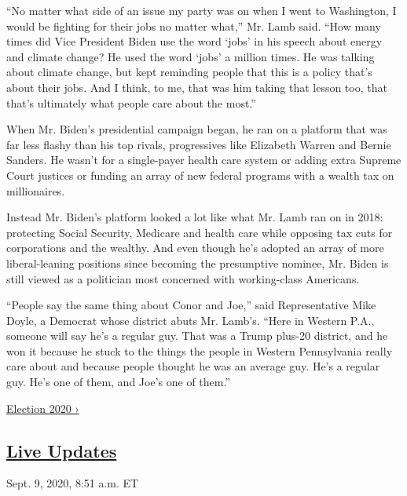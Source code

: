 ``No matter what side of an issue my party was on when I went to
Washington, I would be fighting for their jobs no matter what,'' Mr.
Lamb said. ``How many times did Vice President Biden use the word `jobs'
in his speech about energy and climate change? He used the word `jobs' a
million times. He was talking about climate change, but kept reminding
people that this is a policy that's about their jobs. And I think, to
me, that was him taking that lesson too, that that's ultimately what
people care about the most.''

When Mr. Biden's presidential campaign began, he ran on a platform that
was far less flashy than his top rivals, progressives like Elizabeth
Warren and Bernie Sanders. He wasn't for a single-payer health care
system or adding extra Supreme Court justices or funding an array of new
federal programs with a wealth tax on millionaires.

Instead Mr. Biden's platform looked a lot like what Mr. Lamb ran on in
2018: protecting Social Security, Medicare and health care while
opposing tax cuts for corporations and the wealthy. And even though he's
adopted an array of more liberal-leaning positions since becoming the
presumptive nominee, Mr. Biden is still viewed as a politician most
concerned with working-class Americans.

``People say the same thing about Conor and Joe,'' said Representative
Mike Doyle, a Democrat whose district abuts Mr. Lamb's. ``Here in
Western P.A., someone will say he's a regular guy. That was a Trump
plus-20 district, and he won it because he stuck to the things the
people in Western Pennsylvania really care about and because people
thought he was an average guy. He's a regular guy. He's one of them, and
Joe's one of them.''

\href{https://www.nytimes3xbfgragh.onion/news-event/2020-election}{Election
2020 ›}

\hypertarget{live-updates}{%
\subsection{\texorpdfstring{\href{https://www.nytimes3xbfgragh.onion/live/2020/09/09/us/trump-vs-biden}{Live
Updates}}{Live Updates}}\label{live-updates}}

\href{https://www.nytimes3xbfgragh.onion/live/2020/09/09/us/trump-vs-biden\#democrats-worry-about-a-partisan-slant-at-the-postal-service-where-trump-allies-dominate-the-board}{}

Sept. 9, 2020, 8:51 a.m. ET

